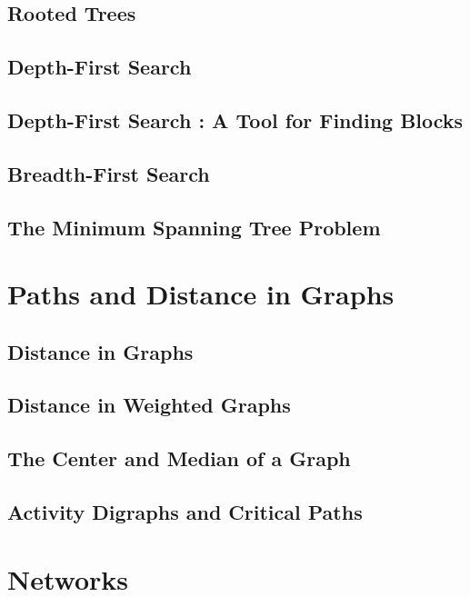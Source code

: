 \section{Rooted Trees}
\section{Depth-First Search}
\section{Depth-First Search : A Tool for Finding Blocks}
\section{Breadth-First Search}
\section{The Minimum Spanning Tree Problem}

\chapter{Paths and Distance in Graphs}
\section{Distance in Graphs}
\section{Distance in Weighted Graphs}
\section{The Center and Median of a Graph}
\section{Activity Digraphs and Critical Paths}

\chapter{Networks}
